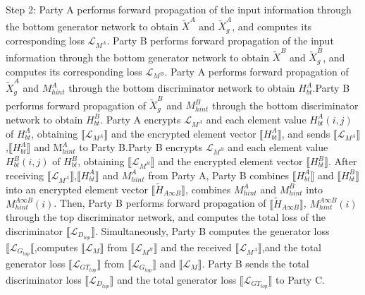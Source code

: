 \documentclass[final,1p,times]{elsarticle}
\begin{document}

Step 2: Party A performs forward propagation of the input information through the bottom generator network to obtain $\tilde{X}^{A}$ and $\tilde{X}_g^A$, and computes its corresponding loss $\mathcal{L}_{M^A}$. Party B performs forward propagation of the input information through the bottom generator network to obtain $\tilde{X}^{B}$ and $\tilde{X}_{g}^{B}$, and computes its corresponding loss $\mathcal{L}_{{M}^{{B}}}$. Party A performs forward propagation of $\tilde{X}_{{g}}^{{A}}$ and ${M_{hint}^{A}}$ through the bottom discriminator network to obtain ${H_{bt}^A}$.Party B performs forward propagation of $\tilde{{X}}_{{g}}^{{B}}$ and ${M_{hint}^{B}}$ through the bottom discriminator network to obtain ${H_{bt}^B}$. Party A encrypts $\mathcal{L}_{{M^{A}}}$ and each element value ${H_{bt}^A(i,j)}$ of ${H_{bt}^A}$, obtaining $\llbracket\mathcal{L}_{M^A}\rrbracket$ and the encrypted element vector $\llbracket{H}_{bt}^{A}\rrbracket$, and sends $\llbracket\mathcal{L}_{{M^A}}\rrbracket$,$\llbracket{H}_{bt}^{A}\rrbracket$ and $\mathrm{M}_{{hint}}^A$ to Party B.Party B encrypts $\mathcal{L}_{{M^{B}}}$ and each element value ${H_{bt}^B(i,j)}$ of ${H_{bt}^B}$, obtaining $\llbracket \mathcal{L}_{M^B}\rrbracket$ and the encrypted element vector $\llbracket{H}_{bt}^{B}\rrbracket$. After receiving $\llbracket\mathcal{L}_{{M^A}}\rrbracket$,$\llbracket{H}_{bt}^{A}\rrbracket$ and ${M}_{{hint}}^A$ from Party A, Party B combines $\llbracket{H}_{bt}^{A}\rrbracket$ and $\llbracket{H}_{bt}^{B}\rrbracket$ into an encrypted element vector $\llbracket\widetilde{{H}}_{{A}\infty{B}}\rrbracket$, combines ${M_{hint}^A}$ and ${M_{hint}^B}$ into ${M_{hint}^{A\infty B}(i)}$. Then, Party B performs forward propagation of $\llbracket\widetilde{{H}}_{{A}\infty{B}}\rrbracket$, ${M_{hint}^{A\infty B}(i)}$ through the top discriminator network, and computes the total loss of the discriminator $\llbracket\mathcal{L}_{{D_{top}}}\rrbracket$.
Simultaneously, Party B computes the generator loss $\llbracket\mathcal{L}_{{G_{top}}}\llbracket$,computes $\llbracket\mathcal{L}_{{M}}\rrbracket$ from $\llbracket\mathcal{L}_{{M}^{{B}}}\rrbracket$ and the received $\llbracket\mathcal{L}_{{M^A}}\rrbracket$,and the total generator loss $\llbracket\mathcal{L}_{{GT_{top}}}\rrbracket$ from $\llbracket\mathcal{L}_{{G_{top}}}\rrbracket$ and $\llbracket\mathcal{L}_{{M}}\rrbracket$. Party B sends the total discriminator loss $\llbracket\mathcal{L}_{{D_{top}}}\rrbracket$ and the total generator loss $\llbracket\mathcal{L}_{{GT}_{{top}}}\rrbracket$ to Party C.
 
\end{document}
